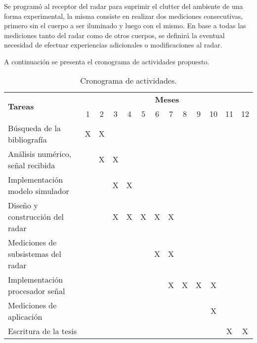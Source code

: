 Se programó al receptor del radar para suprimir el clutter del ambiente de una forma experimental, la misma consiste en realizar dos mediciones consecutivas, primero sin el cuerpo a ser iluminado y luego con el mismo. En base a todas las mediciones tanto del radar como de otros cuerpos, se definirá la eventual necesidad de efectuar experiencias adicionales o modificaciones al radar.

A continuación se presenta el cronograma de actividades propuesto.

\begin{table}[htb]
  \caption{Cronograma de actividades.}
  \centering
  \label{tab:antennasParameters}
  \begin{tabular}{l *{12}{c}}
  \toprule
  \multirow{2}{*}{\textbf{Tareas}} & \multicolumn{12}{c}{\textbf{Meses}} \tabularnewline
  \cmidrule{2-13}
   & 1 & 2 & 3 & 4 & 5 & 6 & 7 & 8 & 9 & 10 & 11 & 12 \tabularnewline
  \midrule

  Búsqueda de la bibliografía & X & X & & & & & & & & & & \tabularnewline

  Análisis numérico, señal recibida & & X & X & & & & & & & & & \tabularnewline

  Implementación modelo simulador & & & X & X & & & & & & & & \tabularnewline

  Diseño y construcción del radar & & & X & X & X & X & X & & & & & \tabularnewline

  Mediciones de subsistemas del radar & & & & & & X & X & & & & & \tabularnewline

  Implementación procesador señal  & & & & & & & X & X & X & X & & \tabularnewline

  Mediciones de aplicación & & & & & & & & & & X & & \tabularnewline

  Escritura de la tesis & & & & & & & & & & & X & X \tabularnewline

  \bottomrule
  \end{tabular}
\end{table}
